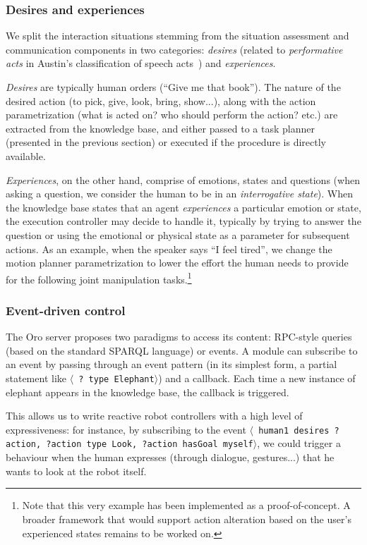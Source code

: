 \documentclass[preprint,3p,times]{elsarticle}
\newcommand{\stmt}[1]{{\footnotesize \tt $\langle$ #1\relax$\rangle$}}
\begin{document}
\subsubsection{Desires and experiences}

We split the interaction situations stemming from the situation assessment and
communication components in two categories: \emph{desires} (related to
\emph{performative acts} in Austin's classification of speech
acts~\cite{Austin1962}) and \emph{experiences}.

\emph{Desires} are typically human orders (``Give me that book''). The nature
of the desired action (to pick, give, look, bring, show...), along with the
action parametrization (what is acted on? who should perform the action? etc.)
are extracted from the knowledge base, and either passed to a task planner
(presented in the previous section) or executed if the procedure is directly
available.

\emph{Experiences}, on the other hand, comprise of emotions, states and
questions (when asking a question, we consider the human to be in an
\emph{interrogative state}). When the knowledge base states that an agent
\emph{experiences} a particular emotion or state, the execution controller may
decide to handle it, typically by trying to answer the question or using the
emotional or physical state as a parameter for subsequent actions. As an
example, when the speaker says ``I feel tired'', we change the motion planner
parametrization to lower the effort the human needs to provide for the following
joint manipulation tasks.\footnote{Note that this very example has been
implemented as a proof-of-concept. A broader framework that would support
action alteration based on the user's experienced states remains to be worked on.}

\subsubsection{Event-driven control}

The {\sc Oro} server proposes two paradigms to access its content: RPC-style
queries (based on the standard SPARQL language) or events. A module can
subscribe to an event by passing through an event pattern (in its simplest
form, a partial statement like \stmt{? type Elephant}) and a callback.  Each
time a new instance of elephant appears in the knowledge base, the callback is
triggered.

This allows us to write reactive robot controllers with a high level of
expressiveness: for instance, by subscribing to the event \stmt{human1 desires
?action, ?action type Look, ?action hasGoal myself}, we could trigger a
behaviour when the human expresses (through dialogue, gestures...) that he
wants to look at the robot itself.
\end{document}
